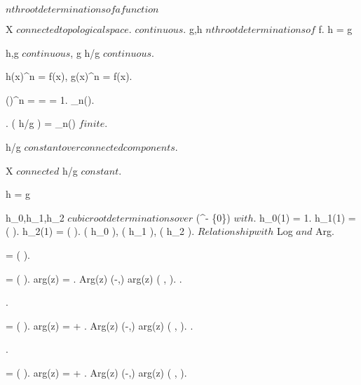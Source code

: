 \documentclass[12pt]{book}
\begin{document}
{

\unit{ $ nth root determinations of a function $ }
{
	\baselineskip=30pt

	{
		{
			X $ connected topological space $.
			 $ continuous $.
			g,h $ nth root determinations of $ f.
		}
		\holds
		{
			{
				h = \zeta g
			}
		}
		\demonstration
		{
			h,g $ continuous $, g  \imp h/g $ continuous $.

			{
				h(x)^n = f(x), \s g(x)^n = f(x).

				\left(\right)^n =  =   = 1.
				 \in \mu_n(\C).
			}.
			\im( h/g ) = \mu_n(\C) $ finite $.

			h/g $ constant over connected components $.

			X $ connected $ \imp h/g $ constant $.

			{
				h = \zeta g
			}
		}
	}

	\newpage 
	{
		{
			h_0,h_1,h_2 $ cubic root determinations over $ \C \setminus (\R^- \times \{0\}) $ with $.
			h_0(1) = 1.
			h_1(1) = \exp(  ).
			h_2(1) = \exp(  ).
		}
		\study
		{
			\im( h_0 ), \im( h_1 ), \im( h_2 ).
			$Relationship with $ Log $ and $ Arg.
		}
		\demonstration
		{
			{
				 = \exp(  ).

				{
					 = \exp(  ).
					arg(z) = .
					Arg(z) \in (-\pi,\pi) \imp arg(z) \in ( , ).
				}.

				.

				{
					 = \exp(  ).
					arg(z) =  + .
					Arg(z) \in (-\pi,\pi) \imp arg(z) \in ( ,  \pi  ).
				}.

				.

				{
					 = \exp(  ).
					arg(z) =  + .
					Arg(z) \in (-\pi,\pi) \imp arg(z) \in ( \pi, \frac{ 5\pi }{ 3 } ).
				}

}}}}}
\end{document}
